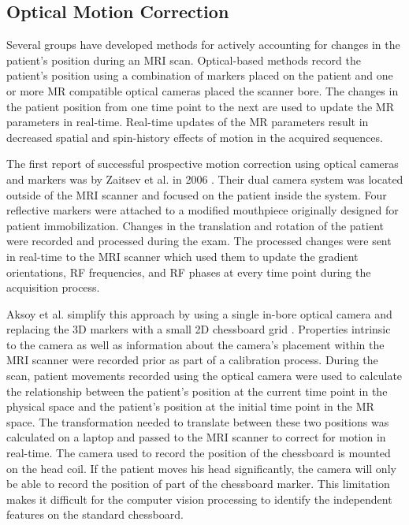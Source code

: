 \subsection{Optical Motion Correction}

Several groups have developed methods for actively accounting for changes in the patient's position during an MRI scan. Optical-based methods record the patient's position using a combination of markers placed on the patient and one or more MR compatible optical cameras placed the scanner bore. The changes in the patient position from one time point to the next are used to update the MR parameters in real-time. Real-time updates of the MR parameters result in decreased spatial and spin-history effects of motion in the acquired sequences.

The first report of successful prospective motion correction using optical cameras and markers was by Zaitsev et al. in 2006 \cite{Zaitsev2006}. Their dual camera system was located outside of the MRI scanner and focused on the patient inside the system. Four reflective markers were attached to a modified mouthpiece originally designed for patient immobilization. Changes in the translation and rotation of the patient were recorded and processed during the exam. The processed changes were sent in real-time to the MRI scanner which used them to update the gradient orientations, RF frequencies, and RF phases at every time point during the acquisition process.

Aksoy et al. simplify this approach by using a single in-bore optical camera and replacing the 3D markers with a small 2D chessboard grid \cite{Aksoy2008}. Properties intrinsic to the camera as well as information about the camera's placement within the MRI scanner were recorded prior as part of a calibration process. During the scan, patient movements recorded using the optical camera were used to calculate the relationship between the patient's position at the current time point in the physical space and the patient's position at the initial time point in the MR space. The transformation needed to translate between these two positions was calculated on a laptop and passed to the MRI scanner to correct for motion in real-time. The camera used to record the position of the chessboard is mounted on the head coil. If the patient moves his head significantly, the camera will only be able to record the position of part of the chessboard marker. This limitation makes it difficult for the computer vision processing to identify the independent features on the standard chessboard. 

